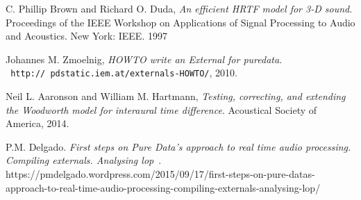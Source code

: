 \documentclass[journal]{IEEEtran}
\begin{document}
\begin{thebibliography}{4}

C. Phillip Brown and Richard O. Duda, \textit{An efficient HRTF model for 3-D sound}. Proceedings of the IEEE Workshop on Applications of Signal Processing to Audio and Acoustics. New York: IEEE. 1997

Johannes M. Zmoelnig, \textit{HOWTO write an External for puredata}.\\\texttt{ http://
pdstatic.iem.at/externals-HOWTO/}, 2010.

Neil L. Aaronson and William M. Hartmann, \textit{Testing, correcting, and extending the Woodworth model
for interaural time difference}. Acoustical Society of America, 2014.

 P.M. Delgado. \textit{First steps on Pure Data’s approach to real time audio processing. Compiling externals. Analysing lop~}. https://pmdelgado.wordpress.com/2015/09/17/first-steps-on-pure-datas-approach-to-real-time-audio-processing-compiling-externals-analysing-lop/



\end{thebibliography}




%
%
%
%
%
\end{document}
